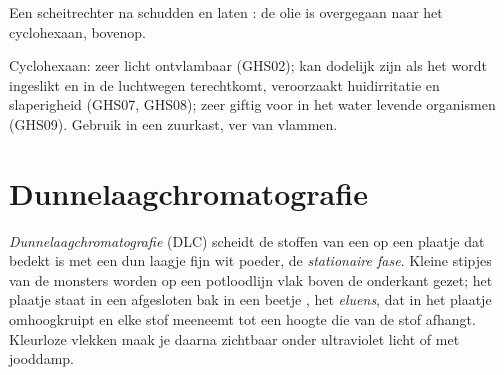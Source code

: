 \begin{omfigure}

{\small Een scheitrechter na schudden en laten : de olie is
overgegaan naar het cyclohexaan, bovenop.}
\end{omfigure}

\begin{safety}{}
Cyclohexaan: zeer licht ontvlambaar (GHS02); kan dodelijk zijn als het
wordt ingeslikt en in de luchtwegen terechtkomt, veroorzaakt
huidirritatie en slaperigheid (GHS07, GHS08); zeer giftig voor in het
water levende organismen (GHS09). Gebruik in een zuurkast, ver van
vlammen.
\end{safety}

\section{Dunnelaagchromatografie}

\begin{definition}[Dunnelaagchromatografie]\label{def:g10:chemical-species:tlc}
\emph{Dunnelaagchromatografie} (DLC)
scheidt de stoffen van een  op een plaatje dat bedekt is met een
dun laagje fijn wit poeder, de \emph{stationaire fase}.
Kleine stipjes van de monsters worden op een potloodlijn vlak boven de
onderkant gezet; het plaatje staat in een afgesloten bak in een beetje
, het \emph{eluens}, dat in het plaatje
omhoogkruipt en elke stof meeneemt tot een hoogte die van de stof
afhangt. Kleurloze vlekken maak je daarna zichtbaar onder ultraviolet
licht of met jooddamp.
\end{definition}

